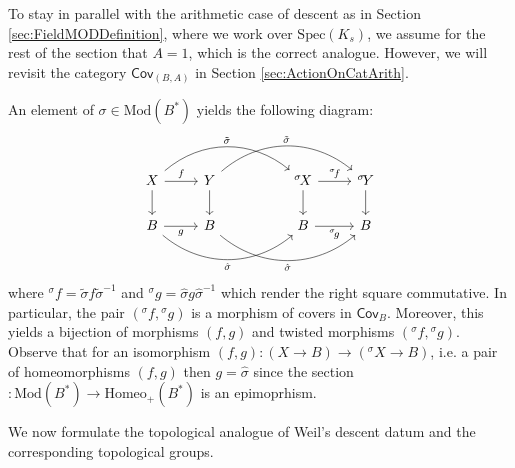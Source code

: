 \documentclass[10pt]{amsart}
\theoremstyle{definition}
\newcommand{\Spe}{ {\mathrm{Spec} } }
\begin{document}
To stay in parallel with the arithmetic case of descent as in Section \ref{sec:FieldMODDefinition}, where we work over $\Spe(K_s)$, we assume for the rest of the section that $A=1$, which is the correct analogue. However, we will revisit the category $\mathsf{Cov}_{(B,A)}$ in Section \ref{sec:ActionOnCatArith}.

An element of $\sigma \in \mathrm{Mod}(B^*)$ yields the following diagram:
\begin{equation*}
    \begin{tikzcd}
        X \arrow[r, "f"] \arrow[rrr, bend left=40, "\tilde{\sigma}"] \arrow[d] & Y \arrow[d] \arrow[rrr, bend left=40, "\tilde{\sigma}"] & & {^\sigma \! X} \arrow[r, "{^\sigma \!f}"] \arrow[d] & {^\sigma \! Y} \arrow[d]\\
        B \arrow[r, "g"'] \arrow[rrr, bend right=40, "\hat{\sigma}"']& B \arrow[rrr, bend right=40, "\hat{\sigma}"'] & & B \arrow[r, "{^\sigma \!g}"'] & B
    \end{tikzcd}
\end{equation*}
where ${^\sigma \! f} = \tilde{\sigma} f \tilde{\sigma}^{-1}$ and ${^\sigma \! g} = \hat{\sigma} g \hat{\sigma}^{-1}$ which render the right square commutative. In particular, the pair $({^\sigma \! f} , {^\sigma \! g})$ is a morphism of covers in $\mathsf{Cov}_B$. Moreover, this yields a bijection of morphisms $(f,g)$ and twisted morphisms $({^\sigma \! f} , {^\sigma \! g})$.
Observe that for an isomorphism $(f,g) \colon (X \to B) \to ({^\sigma \! X} \to B)$, i.e. a pair of homeomorphisms $(f,g)$ then $g = \hat{\sigma}$ since the section $ \hat{} : \mathrm{Mod}(B^*) \rightarrow \mathrm{Homeo}_+(B^*)$ is an epimoprhism. 

We now formulate the topological analogue of Weil's descent datum and the corresponding topological groups.
\end{document}
